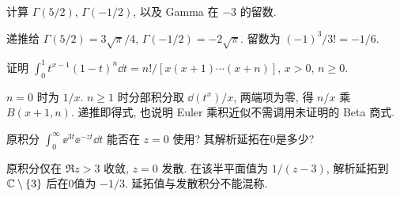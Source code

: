 \begin{exercise}
计算 $\Gamma(5/2)$, $\Gamma(-1/2)$, 以及 Gamma 在 $-3$ 的留数.
\end{exercise}
\begin{solution}
递推给 $\Gamma(5/2)=3\sqrt\pi/4$, $\Gamma(-1/2)=-2\sqrt\pi$. 留数为 $(-1)^3/3!=-1/6$.
\end{solution}
\begin{exercise}
证明 $\int_0^1t^{x-1}(1-t)^n\dd t=n!/[x(x+1)\cdots(x+n)]$, $x>0$, $n\ge0$.
\end{exercise}
\begin{solution}
$n=0$ 时为 $1/x$. $n\ge1$ 时分部积分取 $\dd(t^x)/x$, 两端项为零, 得 $n/x$ 乘 $B(x+1,n)$. 递推即得式, 也说明 Euler 乘积近似不需调用未证明的 Beta 商式.
\end{solution}
\begin{exercise}
原积分 $\int_0^\infty\ee^{3t}\ee^{-zt}\dd t$ 能否在 $z=0$ 使用? 其解析延拓在0是多少?
\end{exercise}
\begin{solution}
原积分仅在 $\Re z>3$ 收敛, $z=0$ 发散. 在该半平面值为 $1/(z-3)$, 解析延拓到 $\mathbb C\setminus\{3\}$ 后在0值为 $-1/3$. 延拓值与发散积分不能混称.
\end{solution}
